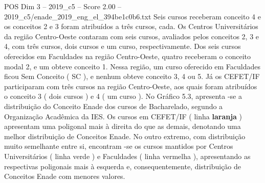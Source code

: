 \begin{textsample}{POS Dim 3 – 2019\_c5 – Score 2.00 – 2019\_c5/enade\_2019\_eng\_el\_394be1c0b6.txt}
Seis cursos receberam conceito 4 e os conceitos 2 e 3 foram atribuídos a três cursos, cada.
Os Centros Universitários da região Centro-Oeste contaram com seis cursos, avaliados pelos conceitos 2, 3 e 4, com três cursos, dois cursos e um curso, respectivamente.
Dos seis cursos oferecidos em Faculdades na região Centro-Oeste, quatro receberam o conceito modal 2, e um obteve conceito 1.
Nessa região, um curso oferecido em Faculdades ficou Sem Conceito ( SC ), e nenhum obteve conceito 3, 4 ou 5.
Já os CEFET/IF participaram com três cursos na região Centro-Oeste, aos quais foram atribuídos o conceito 3 ( dois cursos ) e 4 ( um curso ).
No Gráfico 5.3, apresenta -se a distribuição do Conceito Enade dos cursos de Bacharelado, segundo a Organização Acadêmica da IES.
Os cursos em CEFET/IF ( linha \textbf{laranja} ) apresentam uma poligonal mais à direita do que as demais, denotando uma melhor distribuição de Conceitos Enade.
No outro extremo, com distribuição muito semelhante entre si, encontram -se os cursos mantidos por Centros Universitários ( linha verde ) e Faculdades ( linha vermelha ), apresentando as respectivas poligonais mais à esquerda e, consequentemente, distribuição de Conceitos Enade com menores valores.

\end{textsample}
